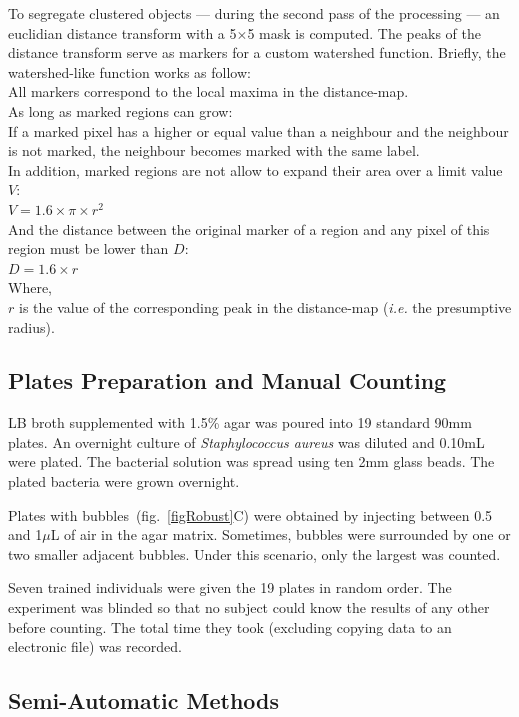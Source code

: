 \documentclass[10pt]{article}
\newcommand{\N}{Seven}
\newcommand{\sa}{\emph{Staphylococcus aureus}}
\begin{document}
To segregate clustered objects --- during the second pass of the processing ---
an euclidian distance transform with a 5$\times{}$5 mask is computed.
The peaks of the distance transform serve as markers for a custom watershed
function. Briefly, the watershed-like function works as follow:\\
All markers correspond to the local maxima in the distance-map.\\
As long as marked regions can grow:\\  
If a marked pixel has a higher or equal value than a neighbour and the neighbour
is not marked, the neighbour becomes marked with the same label.\\
In addition, marked regions are not allow to expand their area over a limit value $V$:\\
 $V = 1.6\times{}\pi\times{}{r}^2$ \\
 And the distance between the original marker of a region and any pixel of this region must be lower than $D$:\\
 $D = 1.6\times{}{r}$\\
 \newline{}
 Where,\\
 $r$ is the value of the corresponding peak in the distance-map (\emph{i.e.} the
 presumptive radius).
 

\subsection*{Plates Preparation and Manual Counting}
LB broth supplemented with 1.5\% agar was poured into 19 standard 90mm plates.
An overnight culture of \sa{} was diluted and 0.10mL were plated. The bacterial
solution was spread using ten 2mm glass beads. The plated bacteria were grown
overnight.

Plates with bubbles~(fig.~\ref{figRobust}C) were obtained by injecting between 0.5 and 1$\mu{}$L of air in the agar matrix.
Sometimes, bubbles were surrounded by one or two smaller adjacent bubbles. Under this scenario, only the largest was counted.

\N{} trained individuals were given the 19 plates in random order. The
experiment was blinded so that no subject could know the results of any other before counting.
The total time they took (excluding copying data to an electronic file) was
recorded.

\subsection*{Semi-Automatic Methods} 
\end{document}
